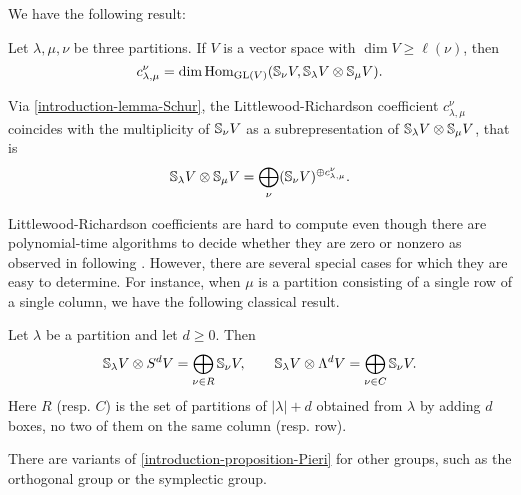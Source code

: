 We have the following result:
\begin{lemma}
 \label{introduction-lemma-LRcoefficientGL}
  Let $\lambda,\mu,\nu$ be three partitions. If $V$ is a vector space with $\dim V \geq \ell(\nu)$, then 
 \[
c^\nu_{\lambda,\mu} = \dim \operatorname{Hom}_{\mathrm{GL}(V)} (\mathbb{S}_\nu V,  \mathbb{S}_\lambda V \otimes \mathbb{S}_\mu V ).
\]
\end{lemma}
Via \ref{introduction-lemma-Schur}, the Littlewood-Richardson coefficient $c^\nu_{\lambda,\mu} $ coincides with the multiplicity of $\mathbb{S}_\nu V$ as a subrepresentation of $ \mathbb{S}_\lambda V \otimes \mathbb{S}_\mu V $, that is 
\[
 \mathbb{S}_\lambda V \otimes \mathbb{S}_\mu V  = \bigoplus_{\nu } (\mathbb{S}_{\nu} V )^{\oplus c^\nu_{\lambda,\mu} }.
\]

Littlewood-Richardson coefficients are hard to compute \cite{Nar06} even though there are polynomial-time algorithms to decide whether they are zero or nonzero as observed in \cite{MNS12} following \cite{KT99}. However, there are several special cases for which they are easy to determine. For instance, when $\mu$ is a partition consisting of a single row of a single column, we have the following classical result.
\begin{proposition}
\label{introduction-proposition-Pieri}
 Let $\lambda$ be a partition and let $d \geq 0$. Then 
 \[
 \mathbb{S}_{\lambda} V \otimes S^d V = \bigoplus_{\nu \in R} \mathbb{S}_{\nu} V, \qquad  \mathbb{S}_{\lambda} V \otimes \Lambda^d V = \bigoplus_{\nu \in C} \mathbb{S}_{\nu} V.
 \]
Here $R$ (resp. $C$) is the set of partitions of $|\lambda|+d$ obtained from $\lambda$ by adding $d$ boxes, no two of them on the same column (resp. row).
\end{proposition}
There are variants of \ref{introduction-proposition-Pieri} for other groups, such as the orthogonal group or the symplectic group.

